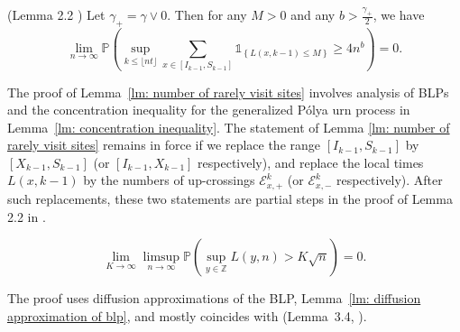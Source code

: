 \documentclass[EJP]{ejpecp} %
\begin{document}
\begin{lemma}(Lemma 2.2 \cite{KMP23})\label{lm: number of rarely visit sites}
	Let $\gamma_+ = \gamma \vee 0$. Then for any $M>0$ and any $b>\frac{\gamma_+}{2}$, we have
	\[
	\lim_{n\to\infty} \mathbb{P}\left(\sup_{k\leq\lfloor nt \rfloor}  \sum_{x\in [I_{k-1}, S_{k-1}]} \mathbb{1}_{\left\{ L(x,k-1) \leq M \right\}} \geq 4n^b \right) = 0.
	\]
	
\end{lemma}	
The proof of Lemma~\ref{lm: number of rarely visit sites} involves analysis of BLPs and the concentration inequality for the generalized P\'{o}lya urn process in Lemma~\ref{lm: concentration inequality}. The statement of Lemma \ref{lm: number of rarely visit sites} remains in force if we replace the range $[I_{k-1}, S_{k-1}]$ by $[X_{k - 1},S_{k - 1}]$ (or $[I_{k-1},X_{k - 1}]$ respectively), and replace the local times $L(x,k-1)$ by the numbers of up-crossings $\mathcal{E}^{k}_{x,+}$ (or $\mathcal{E}^{k}_{x,-}$ respectively). After such replacements, these two statements are partial steps in the proof of Lemma 2.2 in \cite{KMP23}.   

\begin{lemma}
	\label{lm: uniform control of local time}
	\[
	\lim_{K \to  \infty } \limsup_{n \to \infty } \mathbb{P}\left( \sup_{y \in \mathbb{Z}} L\left( y, n \right) > K \sqrt{n}  \right) = 0
	.\] 
\end{lemma}
The proof uses diffusion approximations of the BLP, Lemma~\ref{lm: diffusion approximation of blp}, and mostly coincides with (Lemma~3.4, \cite{KP16}). 
\end{document}
